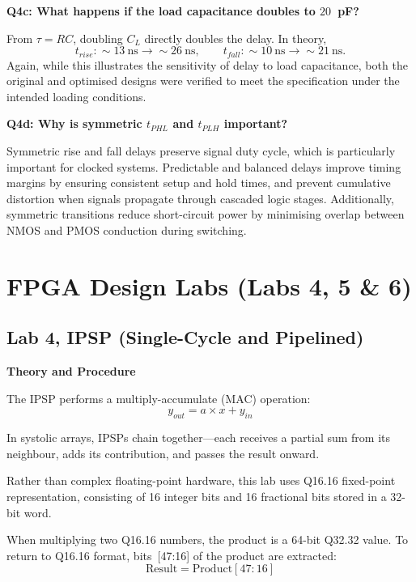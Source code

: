 \documentclass[a4paper,12pt]{article}
\begin{document}
\textbf{Q4c: What happens if the load capacitance doubles to $20$~pF?}

From $\tau = RC$, doubling $C_L$ directly doubles the delay. In theory,
\[
t_{rise}: \sim 13~\text{ns} \rightarrow \sim 26~\text{ns},
\qquad
t_{fall}: \sim 10~\text{ns} \rightarrow \sim 21~\text{ns}.
\]
Again, while this illustrates the sensitivity of delay to load capacitance, both the original and optimised designs were verified to meet the specification under the intended loading conditions.

\textbf{Q4d: Why is symmetric $t_{PHL}$ and $t_{PLH}$ important?}

Symmetric rise and fall delays preserve signal duty cycle, which is particularly important for clocked systems. Predictable and balanced delays improve timing margins by ensuring consistent setup and hold times, and prevent cumulative distortion when signals propagate through cascaded logic stages. Additionally, symmetric transitions reduce short-circuit power by minimising overlap between NMOS and PMOS conduction during switching.

\section{FPGA Design Labs \- (Labs 4, 5 \& 6)}

\subsection{Lab 4, IPSP (Single-Cycle and Pipelined)}

\textbf{Theory and Procedure}

The IPSP performs a multiply-accumulate (MAC) operation:
\begin{equation}
y_{out} = a \times x + y_{in}
\end{equation}

In systolic arrays, IPSPs chain together—each receives a partial sum from its neighbour, adds its contribution, and passes the result onward.

Rather than complex floating-point hardware, this lab uses Q16.16 fixed-point representation, consisting of 16 integer bits and 16 fractional bits stored in a 32-bit word.

When multiplying two Q16.16 numbers, the product is a 64-bit Q32.32 value. To return to Q16.16 format, bits~[47:16] of the product are extracted:
\begin{equation}
\text{Result} = \text{Product}[47:16]
\end{equation}
\end{document}

